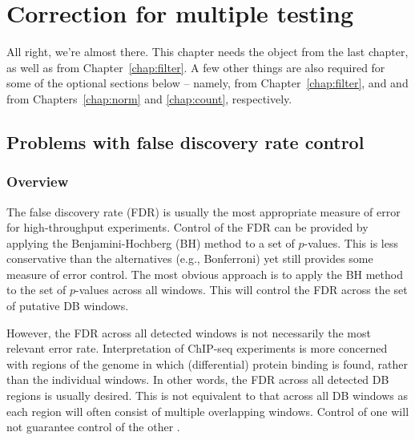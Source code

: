 \documentclass{report}\usepackage[]{graphicx}\usepackage[usenames,dvipsnames]{color}
\newenvironment{combox}
{ \definecolor{shadecolor}{RGB}{255, 240, 240} \begin{shaded}\begin{center}\begin{minipage}[t]{0.95\textwidth} }
{ \end{minipage}\end{center}\end{shaded} \definecolor{shadecolor}{RGB}{240,240,240} }
\begin{document}

\chapter{Correction for multiple testing}

\begin{combox}
All right, we're almost there. 
This chapter needs the  object from the last chapter, as well as  from Chapter~\ref{chap:filter}.
A few other things are also required for some of the optional sections below -- namely,  from Chapter~\ref{chap:filter}, and  and  from Chapters~\ref{chap:norm} and \ref{chap:count}, respectively.
\end{combox}

\section{Problems with false discovery rate control}

\subsection{Overview}
The false discovery rate (FDR) is usually the most appropriate measure of error for high-throughput experiments. 
Control of the FDR can be provided by applying the Benjamini-Hochberg (BH) method \cite{benjamini1995} to a set of $p$-values. 
This is less conservative than the alternatives (e.g., Bonferroni) yet still provides some measure of error control. 
The most obvious approach is to apply the BH method to the set of $p$-values across all windows. 
This will control the FDR across the set of putative DB windows.

However, the FDR across all detected windows is not necessarily the most relevant error rate. 
Interpretation of ChIP-seq experiments is more concerned with regions of the genome in which (differential) protein binding is found, rather than the individual windows.
In other words, the FDR across all detected DB regions is usually desired. 
This is not equivalent to that across all DB windows as each region will often consist of multiple overlapping windows.
Control of one will not guarantee control of the other \cite{lun2014}.
\end{document}
